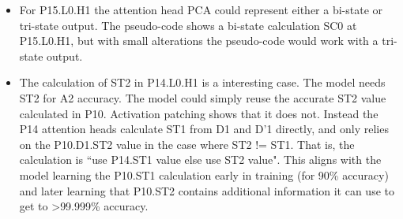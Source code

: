 \documentclass[11pt]{article}
\begin{document}
\begin{itemize}
\item For P15.L0.H1 the attention head PCA could represent either a bi-state or tri-state output. The pseudo-code shows a bi-state calculation SC0 at P15.L0.H1, but with small alterations the pseudo-code would work with a tri-state output.

\item The calculation of ST2 in P14.L0.H1 is a interesting case. The model needs ST2 for A2 accuracy. The model could simply reuse the accurate ST2 value calculated in P10. Activation patching shows that it does not. Instead the P14 attention heads calculate ST1 from D1 and D'1 directly, and only relies on the P10.D1.ST2 value in the case where ST2 != ST1. That is, the calculation is “use P14.ST1 value else use ST2 value". This aligns with the model learning the P10.ST1 calculation early in training (for 90\% accuracy) and later learning that P10.ST2 contains additional information it can use to get to \textgreater{99.999}\% accuracy.
\end{itemize}
\end{document}
